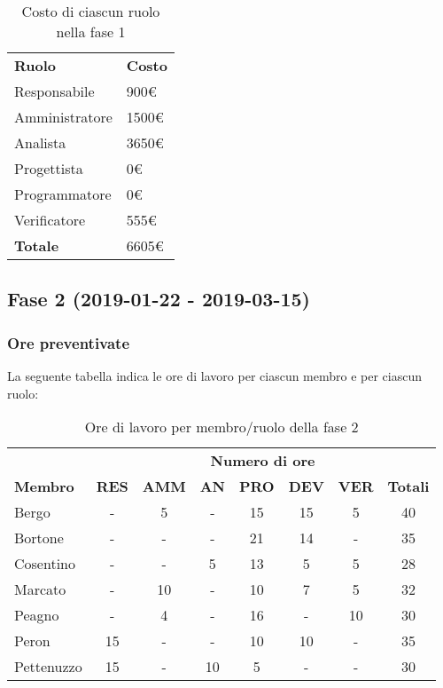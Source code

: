 		\begin{table}[h]
			\centering		
			\begin{tabular}{| l | l |}
				\rowcolor{LightBlue}
				\textbf{\color{white}Ruolo}
				& \textbf{\color{white}Costo}\\
			
				Responsabile 		& 900€\\
				Amministratore 	& 1500€\\
				Analista 				& 3650€\\			
				Progettista 			& 0€\\
				Programmatore 		& 0€\\
				Verificatore 		& 555€\\ \hline
				\textbf{Totale} 	& 6605€\\ \hline
			\end{tabular}
			\caption{Costo di ciascun ruolo nella fase 1}
		\end{table}

\newpage
\subsection{Fase 2 (2019-01-22 - 2019-03-15)}
	\subsubsection{Ore preventivate}
		La seguente tabella indica le ore di lavoro per ciascun membro e per ciascun ruolo:
		\begin{table}[h]
			\centering
			\begin{tabular}{| l | c c c c c c | c |}
				\rowcolor{LightBlue}
				& \multicolumn{7}{c}{\textbf{\color{white}Numero di ore}}	\\
	
				\rowcolor{LightBlue}
				\textbf{\color{white}Membro}
				& \textbf{\color{white}RES}
				& \textbf{\color{white}AMM}
				& \textbf{\color{white}AN}
				& \textbf{\color{white}PRO}
				& \textbf{\color{white}DEV}
				& \textbf{\color{white}VER}
				& \textbf{\color{white}Totali}\\

				Bergo      & - & 5 & - & 15 & 15 & 5 	& 40 \\
				Bortone    & - & - & - & 21 & 14 & - & 35 \\
				Cosentino  & - & - & 5 & 13 & 5 & 5 & 28 \\
				Marcato    & - & 10 & - & 10 & 7 & 5 & 32 \\
				Peagno     & - & 4 & - & 16 & - & 10 & 30 \\
				Peron      & 15 & - & - & 10 & 10 & - & 35 \\
				Pettenuzzo & 15 & - & 10 & 5 & - & - & 30 \\ \hline
			\end{tabular}
			\caption{Ore di lavoro per membro/ruolo della fase 2}
		\end{table}		
		

